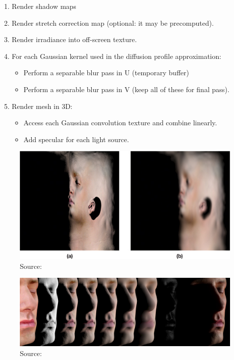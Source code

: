 \documentclass[ngerman,runningheads,a4paper]{llncs}[2018/03/10]
\begin{document}
\begin{enumerate}
  \item Render shadow maps
  \item Render stretch correction map (optional: it may be precomputed).
  \item Render irradiance into off-screen texture.
  \item For each Gaussian kernel used in the diffusion profile approximation:
    \begin{itemize}
      \item Perform a separable blur pass in U (temporary buffer)
      \item Perform a separable blur pass in V (keep all of these for final pass).
    \end{itemize}
  \item Render mesh in 3D:
    \begin{itemize}
      \item Access each Gaussian convolution texture and combine linearly.
      \item Add specular for each light source.
    \end{itemize}
\end{enumerate}

\begin{figure}[!h]
  \centering
  \includegraphics[scale=0.9,keepaspectratio]{./images/irradiance-texture-adrian.jpg}
  \caption{Source: \citet{efficient-human-skin-rendering}}
\end{figure}

\begin{figure}[!h]
  \centering
  \includegraphics[scale=0.4,keepaspectratio]{./images/human-skin-final-rendering.jpg}
  \caption{Source: \citet{efficient-human-skin-rendering}}
\end{figure}
\end{document}
